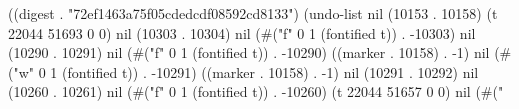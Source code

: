 
((digest . "72ef1463a75f05cdedcdf08592cd8133") (undo-list nil (10153 . 10158) (t 22044 51693 0 0) nil (10303 . 10304) nil (#("f" 0 1 (fontified t)) . -10303) nil (10290 . 10291) nil (#("f" 0 1 (fontified t)) . -10290) ((marker . 10158) . -1) nil (#("w" 0 1 (fontified t)) . -10291) ((marker . 10158) . -1) nil (10291 . 10292) nil (10260 . 10261) nil (#("f" 0 1 (fontified t)) . -10260) (t 22044 51657 0 0) nil (#("%